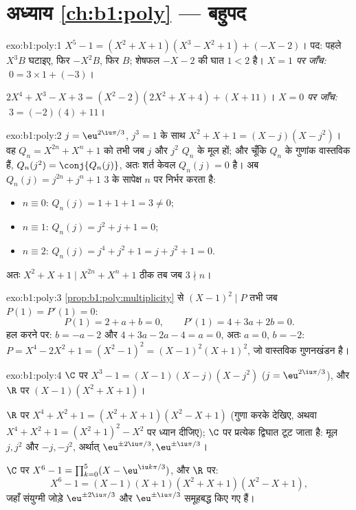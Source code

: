 \section*{अध्याय \ref{ch:b1:poly} --- बहुपद}

\begin{solution}{exo:b1:poly:1}
$X^5 - 1 = (X^2 + X + 1)(X^3 - X^2 + 1) + (-X - 2)$। पद: पहले $X^3 B$ घटाइए,
फिर $-X^2 B$, फिर $B$; शेषफल $-X - 2$ की घात $1 < 2$ है। \emph{$X = 1$ पर
जाँच:} $\;0 = 3 \times 1 + (-3)$।

$2X^4 + X^3 - X + 3 = (X^2 - 2)(2X^2 + X + 4) + (X + 11)$। \emph{$X = 0$ पर
जाँच:} $\;3 = (-2)(4) + 11$।
\end{solution}

\begin{solution}{exo:b1:poly:2}
$j = \eu^{2\iu\pi/3}$, $j^3 = 1$ के साथ $X^2 + X + 1 = (X - j)(X - j^2)$। वह
$Q_n = X^{2n} + X^n + 1$ को तभी  जब $j$ और $j^2$ $Q_n$ के मूल
हों; और चूँकि $Q_n$ के गुणांक वास्तविक हैं, $Q_n(j^2) = \conj{Q_n(j)}$, अतः
शर्त केवल $Q_n(j) = 0$ है। अब $Q_n(j) = j^{2n} + j^n + 1$ $3$ के सापेक्ष $n$
पर निर्भर करता है:
\begin{itemize}
  \item $n \equiv 0$: $Q_n(j) = 1 + 1 + 1 = 3 \neq 0$;
  \item $n \equiv 1$: $Q_n(j) = j^2 + j + 1 = 0$;
  \item $n \equiv 2$: $Q_n(j) = j^4 + j^2 + 1 = j + j^2 + 1 = 0$.
\end{itemize}
अतः $X^2 + X + 1 \mid X^{2n} + X^n + 1$ ठीक तब जब $3 \nmid n$।
\end{solution}

\begin{solution}{exo:b1:poly:3}
\cref{prop:b1:poly:multiplicity} से $(X-1)^2 \mid P$ तभी जब $P(1) = P'(1) =
0$:
\[
P(1) = 2 + a + b = 0, \qquad P'(1) = 4 + 3a + 2b = 0 .
\]
हल करने पर: $b = -a - 2$ और $4 + 3a - 2a - 4 = a = 0$, अतः $a = 0$, $b =
-2$: $P = X^4 - 2X^2 + 1 = (X^2 - 1)^2 = (X-1)^2 (X+1)^2$, जो वास्तविक
गुणनखंडन है।
\end{solution}

\begin{solution}{exo:b1:poly:4}
$\C$ पर $X^3 - 1 = (X - 1)(X - j)(X - j^2)$ ($j = \eu^{2\iu\pi/3}$), और $\R$
पर $(X - 1)(X^2 + X + 1)$।

$\R$ पर $X^4 + X^2 + 1 = (X^2 + X + 1)(X^2 - X + 1)$ (गुणा करके देखिए, अथवा
$X^4 + X^2 + 1 = (X^2+1)^2 - X^2$ पर ध्यान दीजिए); $\C$ पर प्रत्येक द्विघात
टूट जाता है: मूल $j, j^2$ और $-j, -j^2$, अर्थात् $\eu^{\pm 2\iu\pi/3},
\eu^{\pm\iu\pi/3}$।

$\C$ पर $X^6 - 1 = \prod_{k=0}^{5} (X - \eu^{\iu k\pi/3})$, और $\R$ पर:
\[
X^6 - 1 = (X-1)(X+1)(X^2 + X + 1)(X^2 - X + 1),
\]
जहाँ संयुग्मी जोड़े $\eu^{\pm 2\iu\pi/3}$ और $\eu^{\pm \iu\pi/3}$ समूहबद्ध
किए गए हैं।
\end{solution}

